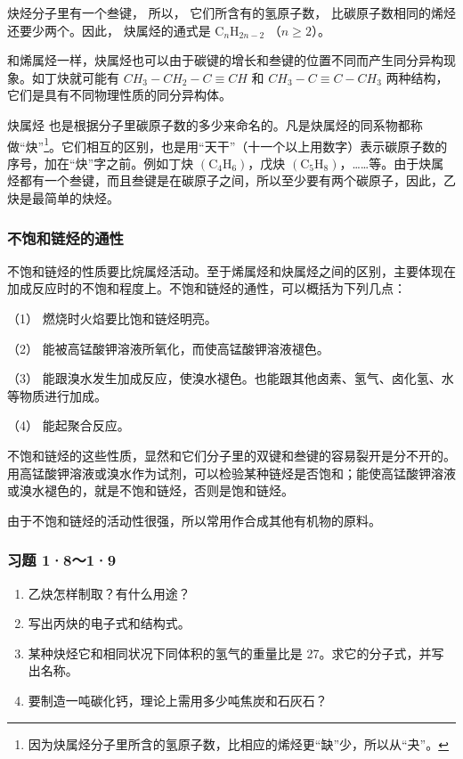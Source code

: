 炔烃分子里有一个叁键， 所以， 它们所含有的氢原子数，
比碳原子数相同的烯烃还要少两个。因此， 炔属烃的通式是
\(\mathrm{C}_{n} \mathrm{H}_{2 n-2}\) （\(n \geqslant 2\)）。

和烯属烃一样，炔属烃也可以由于碳键的增长和叁键的位置不同而产生同分异构现象。如丁炔就可能有
\(CH_{3}-CH_{2}-C\equiv CH\) 和 \(CH_{3}-C\equiv C-CH_{3}\)
两种结构，它们是具有不同物理性质的同分异构体。

炔属烃
也是根据分子里碳原子数的多少来命名的。凡是炔属烃的同系物都称做``炔''\footnote{因为炔属烃分子里所含的氢原子数，比相应的烯烃更``缺''少，所以从``夬''。}。它们相互的区别，也是用``天干''（十一个以上用数字）表示碳原子数的序号，加在``炔''字之前。例如丁炔
\(\left(\mathrm{C}_{4}\mathrm{H}_{6}\right)\)，戊炔
\(\left(\mathrm{C}_{5}\mathrm{H}_{8}\right)\)，\ldots\ldots 等。由于炔属烃都有一个叁键，而且叁键是在碳原子之间，所以至少要有两个碳原子，因此，乙炔是最简单的炔烃。

\subsubsection{不饱和链烃的通性}

不饱和链烃的性质要比烷属烃活动。至于烯属烃和炔属烃之间的区别，主要体现在加成反应时的不饱和程度上。不饱和链烃的通性，可以概括为下列几点：

（1） 燃烧时火焰要比饱和链烃明亮。

（2） 能被高锰酸钾溶液所氧化，而使高锰酸钾溶液褪色。

（3）
能跟溴水发生加成反应，使溴水褪色。也能跟其他卤素、氢气、卤化氢、水等物质进行加成。

（4） 能起聚合反应。

不饱和链烃的这些性质，显然和它们分子里的双键和叁键的容易裂开是分不开的。用高锰酸钾溶液或溴水作为试剂，可以检验某种链烃是否饱和；能使高锰酸钾溶液或溴水褪色的，就是不饱和链烃，否则是饱和链烃。

由于不饱和链烃的活动性很强，所以常用作合成其他有机物的原料。

\subsubsection{习题 1·8～1·9}

\begin{enumerate}
\item
  乙炔怎样制取？有什么用途？
\item
  写出丙炔的电子式和结构式。
\item
  某种炔烃它和相同状况下同体积的氢气的重量比是
  27。求它的分子式，并写出名称。
\item
  要制造一吨碳化钙，理论上需用多少吨焦炭和石灰石？
\end{enumerate}

